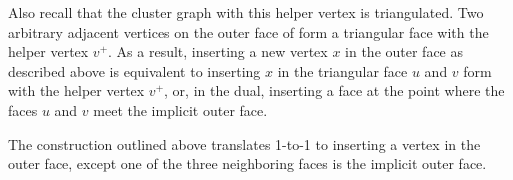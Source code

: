 Also recall that the cluster graph with this helper vertex is triangulated.
Two arbitrary adjacent vertices on the outer face of  form a triangular face with the helper vertex $v^+$.
As a result, inserting a new vertex $x$ in the outer face as described above is equivalent to inserting $x$ in the triangular face $u$ and $v$ form with the helper vertex $v^+$, or, in the dual, inserting a face at the point where the faces $u$ and $v$ meet the implicit outer face.

The construction outlined above translates 1-to-1 to inserting a vertex in the outer face, except one of the three neighboring faces is the implicit outer face.
